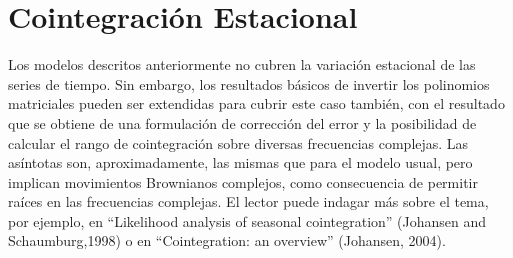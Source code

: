 \section{Cointegraci\'{o}n Estacional}
Los modelos descritos anteriormente no cubren la variaci\'{o}n estacional de las series de tiempo. Sin embargo, los resultados b\'{a}sicos de invertir los polinomios matriciales pueden ser extendidas para cubrir este caso tambi\'{e}n, con el resultado que se obtiene de una formulaci\'{o}n de correcci\'{o}n del error y la posibilidad de calcular el rango de cointegraci\'{o}n sobre diversas frecuencias complejas. Las as\'{i}ntotas son, aproximadamente, las mismas que para el modelo usual, pero implican movimientos Brownianos complejos, como consecuencia de permitir ra\'{i}ces en las frecuencias complejas. El lector puede indagar m\'{a}s sobre el tema, por ejemplo, en ``Likelihood analysis of seasonal cointegration'' (Johansen and Schaumburg,1998) o en ``Cointegration: an overview'' (Johansen, 2004).
